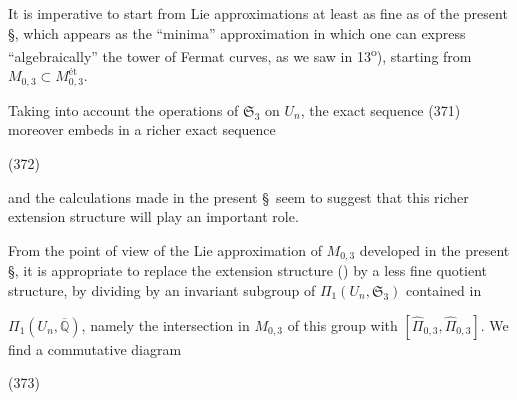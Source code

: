 
It is imperative to start from Lie approximations at least as fine as  of the present \S, which appears as the ``minima'' approximation in which one can express ``algebraically'' the tower of Fermat curves,  as we saw in 13\textsuperscript{o}), starting from $M_{0,3}\subset M_{0,3}^{\text{ét}}$.

Taking into account the operations of $\mathfrak S_3$ on $U_n$, the exact sequence (371) moreover embeds in a richer exact sequence

\begin{samepage}
\noindent (372)
\end{samepage}

and the calculations made in the present \S\ seem to suggest that this richer extension structure will play an important role.

From the point of view of the Lie approximation of $M_{0,3}$ developed in the present \S, it is appropriate to replace the extension structure () by a less fine quotient structure, by dividing by an invariant subgroup of $\Pi_1(U_n,\mathfrak S_3)$ contained in


$\Pi_1(U_n,\overline{\mathbb Q})$, namely the intersection in $M_{0,3}$ of this group with $[\widehat\Pi_{0,3},\widehat\Pi_{0,3}]$. We find a commutative diagram

\begin{samepage}
\noindent (373)
\end{samepage}

